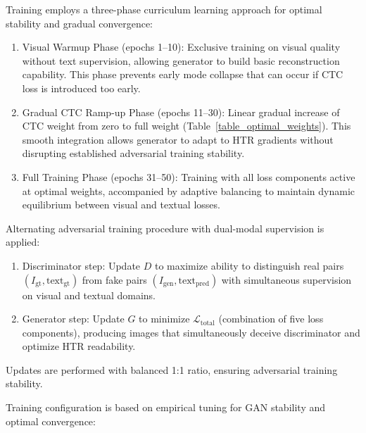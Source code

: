 \documentclass[journal]{IEEEtran}
\begin{document}
Training employs a three-phase curriculum learning approach for optimal stability and gradual convergence:

\begin{enumerate}
    \item Visual Warmup Phase (epochs 1--10): Exclusive training on visual quality without text supervision, allowing generator to build basic reconstruction capability. This phase prevents early mode collapse that can occur if CTC loss is introduced too early.
    
    \item Gradual CTC Ramp-up Phase (epochs 11--30): Linear gradual increase of CTC weight from zero to full weight (Table~\ref{table_optimal_weights}). This smooth integration allows generator to adapt to HTR gradients without disrupting established adversarial training stability.
    
    \item Full Training Phase (epochs 31--50): Training with all loss components active at optimal weights, accompanied by adaptive balancing to maintain dynamic equilibrium between visual and textual losses.
\end{enumerate}

Alternating adversarial training procedure with dual-modal supervision is applied:
\begin{enumerate}
    \item Discriminator step: Update $D$ to maximize ability to distinguish real pairs $(I_{\text{gt}}, \text{text}_{\text{gt}})$ from fake pairs $(I_{\text{gen}}, \text{text}_{\text{pred}})$ with simultaneous supervision on visual and textual domains.
    \item Generator step: Update $G$ to minimize $\mathcal{L}_{\text{total}}$ (combination of five loss components), producing images that simultaneously deceive discriminator and optimize HTR readability.
\end{enumerate}
Updates are performed with balanced 1:1 ratio, ensuring adversarial training stability.

Training configuration is based on empirical tuning for GAN stability and optimal convergence:
\end{document}
